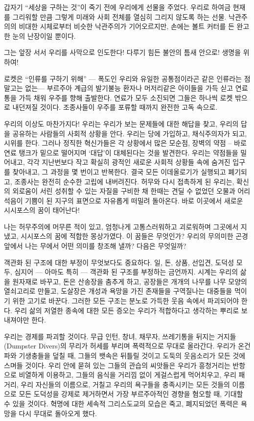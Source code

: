 \documentclass[11pt, b6paper, openany]{memoir}
\begin{document}
\begin{article}
갑자기 “세상을 구하는 것”이 죽기 전에 우리에게 선물을 주었다. 우리로 하여금 현재를 그리워할 만큼 그렇게 미래와 사회 전체를 열심히 그리지 않도록 하는 선물. 낙관주의의 비대한 시체로부터 비슷한 낙관주의가 기어오르지만, 손에는 볼트 커터를 든 완고한 눈의 난장이일 뿐이다.

그는 앞장 서서 우리를 사막으로 인도한다! 다루기 힘든 불안의 틈새 안으로! 생명을 위하여! 

로켓은 “인류를 구하기 위해” — 폭도인 우리와 유일한 공통점이라곤 같은 인류라는 점 말고는 없는— 부르주아 계급의 발기불능 환자나 머저리같은 아이들을 가득 싣고 연료통을 가득 채워 우주를 향해 출발한다. 연료가 모두 소진되면 그들은 하나씩 로켓 밖으로 내던져질 것이다. 조종사들이 우주를 포류할 때까지 완전한 고독 속으로. 

우리의 이상도 마찬가지다! 우리는 우리가 보는 문제들에 대한 해답을 찾고, 우리의 답을 공유하는 사람들의 사회적 상황을 안다. 우리는 당에 가입하고, 채식주의자가 되고, 시위를 한다. 그러나 정직한 혁신가들은 각 상황에서 많은 모순점, 장벽의 약점 – 바로 연료 탱크가 밑으로 떨어지며 ‘대답’이 대체된다는 것을 발견한다. 우리는 약점들을 밀어내고, 각각 지난번보다 작고 확실히 광적인 새로운 사회적 상황들 속에 숨겨진 입구를 찾아내고, 그 과정을 몇 번이고 반복한다. 결국 모든 이데올로기가 실행되고 폐기되고, 조종사는 완전히 순수한 고립에 내버려진다. 허무와 다시 접촉하게 된 우리는, 확신의 외로움이 서린 성취할 수 있는 자질을 구비한 채 한때는 견딜 수 없었던 오물과 어리석음이 기쁨이 된 지구의 표면으로 자유롭게 떠밀려 돌아온다. 바로 이곳에서 새로운 시시포스의 꿈이 태어난다! 

나는 허무주의에 머무른 적이 있고, 엄청나게 고통스러워하고 괴로워하며 그곳에서 지냈고, 시시포스의 꿈에 적합한 몽상가였다. 이 꿈들은 무엇인가? 우리의 무의미한 곤경 앞에서 나는 무에서 어떤 의미를 창조해 낼까? 다음은 무엇일까? 

객관화 된 구조에 대한 부정이 무엇보다도 중요하다. 일, 돈, 상품, 선입견, 도덕성 모두, 심지어 — 아마도 특히 — 객관화 된 구조를 부정하는 금언까지. 시계는 우리의 삶을 원자재로 바꾸고, 돈은 산송장을 춤추게 하고, 공장들은 개개의 나무를 나무 모양의 열쇠고리로 만들고, 도살장은 개성과 욕망을 가진 존재들을 구역질나는 대중들을 먹이기 위한 고기로 바꾼다. 그러한 모든 구조는 분노로 가득한 웃음 속에서 파괴되어야 한다. 우리 삶의 저열한 종속에 대한 모든 증오는 우리가 적합하다고 생각하는 뿌리로 보내져야만 한다. 

우리는 경제를 파괴할 것이다. 무급 인턴, 창녀, 채무자, 쓰레기통을 뒤지는 거지들(Dumpster Divers)의 무리가 허세를 부리며 폭력적으로 무대로 올라간다. 우리가 온건파와 기생충들을 덮칠 때, 그들의 뱃속은 뒤틀릴 것이고 도둑의 웃음소리가 모든 것에 스며들 것이다. 우리 안에 묻혀 있는 그들의 관습의 씨앗들은 우리가 흥청거리는 반항으로 비열하게 이용하고, 그들의 음식을 거리낌 없이 게걸스럽게 먹어치우고, 우리 패거리, 우리 자신들의 이름으로, 거칠고 우리의 욕구들을 충족시키는 모든 것들의 이름으로 모든 도덕성을 강제로 제거하면서 가장 부르주아적인 경향을 혐오할 때, 기대할 수 있을 것이다. 혁명에 대한 세속적 그리스도교의 모습은 죽고, 폐지되었던 폭력은 욕망을 다시 무대로 돌아오게 했다. 


\end{article}
\end{document}
